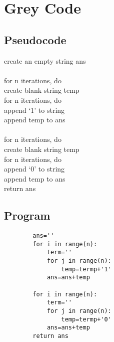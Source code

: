 \documentclass{article}
\begin{document}
	
	\section{Grey Code}
	\subsection{Pseudocode}
		create an empty string ans\\
		\\
		for n iterations, do\\
			create blank string temp\\
			for n iterations, do\\
				append `1' to string\\
		append temp to ans\\
		\\
		for n iterations, do\\
			create blank string temp\\
			for n iterations, do\\
				append `0' to string\\
		append temp to ans\\
		return ans\\
		
	\subsection{Program}
	
		\begin{lstlisting}
		ans=''
		for i in range(n):
			term=''
			for j in range(n):
				temp=termp+'1'
			ans=ans+temp
			
		for i in range(n):
			term=''
			for j in range(n):
				temp=termp+'0'
			ans=ans+temp
		return ans
		\end{lstlisting}
		
		
	
		
			
			
\end{document}
